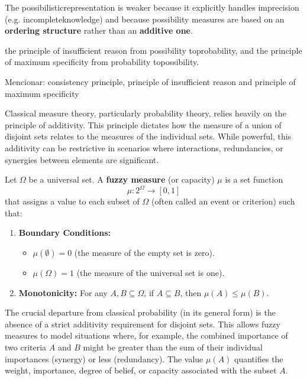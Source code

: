 {The possibilisticrepresentation is weaker because it explicitly handles imprecision (e.g. incompleteknowledge) and because possibility measures are based on an \textbf{ordering structure} rather than an \textbf{additive one}.

the principle of insufficient reason from possibility toprobability, and the principle of maximum specificity from probability topossibility.

Mencionar: consistency principle, principle of insufficient reason and principle of maximum specificity
}










Classical measure theory, particularly probability theory, relies heavily on the principle of additivity. This principle dictates how the measure of a union of disjoint sets relates to the measures of the individual sets. While powerful, this additivity can be restrictive in scenarios where interactions, redundancies, or synergies between elements are significant.

\begin{definition}
Let $\Omega$ be a universal set. A \textbf{fuzzy measure} (or capacity) $\mu$ is a set function
\[ \mu: 2^\Omega \to [0, 1] \]
that assigns a value to each subset of $\Omega$ (often called an event or criterion) such that:
\begin{enumerate}
    \item \textbf{Boundary Conditions:}
    \begin{itemize}
        \item $\mu(\emptyset) = 0$ (the measure of the empty set is zero).
        \item $\mu(\Omega) = 1$ (the measure of the universal set is one).
    \end{itemize}
    \item \textbf{Monotonicity:} For any $A, B \subseteq \Omega$, if $A \subseteq B$, then $\mu(A) \le \mu(B)$.
\end{enumerate}
\end{definition}

The crucial departure from classical probability (in its general form) is the absence of a strict additivity requirement for disjoint sets. This allows fuzzy measures to model situations where, for example, the combined importance of two criteria $A$ and $B$ might be greater than the sum of their individual importances (synergy) or less (redundancy). The value $\mu(A)$ quantifies the weight, importance, degree of belief, or capacity associated with the subset $A$.

